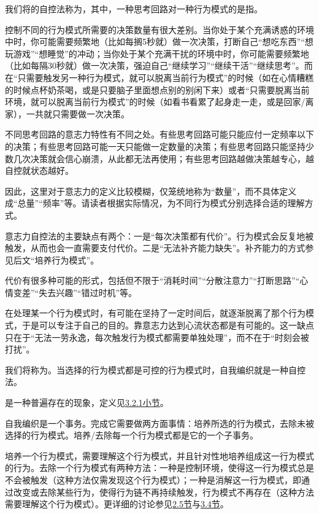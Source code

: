 我们将的自控法称为，其中，一种思考回路对一种行为模式的是指。
\begin{examples}
控制不同的行为模式所需要的决策数量有很大差别。当你处于某个充满诱惑的环境中时，你可能需要频繁地（比如每搁5秒就）做一次决策，打断自己“想吃东西”“想玩游戏”“想睡觉”的冲动；当你处于某个充满干扰的环境中时，你可能需要频繁地（比如每隔30秒就）做一次决策，强迫自己“继续学习”“继续干活”“继续思考”。而在“只需要触发另一种行为模式，就可以脱离当前行为模式”的时候（如在心情糟糕的时候点杯奶茶喝，或是只要脑子里面想点别的别闲下来）或者“只需要脱离当前环境，就可以脱离当前行为模式”的时候（如看书看累了起身走一走，或是回家/离家），一共就只需要做一次决策。

不同思考回路的意志力特性有不同之处。有些思考回路可能只能应付一定频率以下的决策；有些思考回路可能一天只能做一定数量的决策；有些思考回路只能坚持少数几次决策就会信心崩溃，从此都无法再使用；有些思考回路越做决策越专心，越自控就状态越好。

因此，这里对于意志力的定义比较模糊，仅笼统地称为“数量”，而不具体定义成“总量”“频率”等。请读者根据实际情况，为不同行为模式分别选择合适的理解方式。
\end{examples}
意志力自控法的主要缺点有两个：一是“每次决策都有代价”。行为模式会反复地被触发，从而也会一直需要支付代价。二是“无法补齐能力缺失”。补齐能力的方式参见后文“培养行为模式”。
\begin{explain}
代价有很多种可能的形式，包括但不限于“消耗时间”“分散注意力”“打断思路”“心情变差”“失去兴趣”“错过时机”等。

在处理某一个行为模式时，有可能在坚持了一定时间后，就逐渐脱离了那个行为模式，于是可以专注于自己的目的。靠意志力达到心流状态都是有可能的。这一缺点只在于“无法一劳永逸，每次触发行为模式都需要单独处理”，而不在于“时刻会被打扰”。
\end{explain}
我们将称为。当选择的行为模式都是可控的行为模式时，自我编织就是一种自控法。
\begin{explain}
是一种普遍存在的现象，定义见\hyperref[def:编织]{3.2.1小节}。

自我编织是一个事务。完成它需要做两方面事情：培养所选的行为模式，去除未被选择的行为模式。培养/去除每一个行为模式都是它的一个子事务。

培养一个行为模式，需要理解这个行为模式，并且针对性地培养组成这一行为模式的行为。去除一个行为模式有两种方法：一种是控制环境，使得这一行为模式总是不会被触发（这种方法仅需发现这个行为模式）；一种是消解这一行为模式，即通过改变或去除某些行为，使得行为链不再持续触发，行为模式不再存在（这种方法需要理解这个行为模式）。更详细的讨论参见\hyperref[sec:原生家庭]{2.5节}与\hyperref[sec:人的意识演化基本模型]{3.4节}。
\end{explain}
